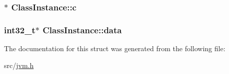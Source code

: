 \subsubsection[{\texorpdfstring{c}{c}}]{$\ast$ Class\+Instance\+::c}\hypertarget{structClassInstance_a315745fb5b53a63e4c9771c778a05373}{}\label{structClassInstance_a315745fb5b53a63e4c9771c778a05373}
\subsubsection[{\texorpdfstring{data}{data}}]{\setlength{\rightskip}{0pt plus 5cm}int32\+\_\+t$\ast$ Class\+Instance\+::data}\hypertarget{structClassInstance_a6096fe53fe197dc9f0642135216ee182}{}\label{structClassInstance_a6096fe53fe197dc9f0642135216ee182}


The documentation for this struct was generated from the following file\+:\begin{DoxyCompactItemize}
\item 
src/\hyperlink{jvm_8h}{jvm.\+h}\end{DoxyCompactItemize}
